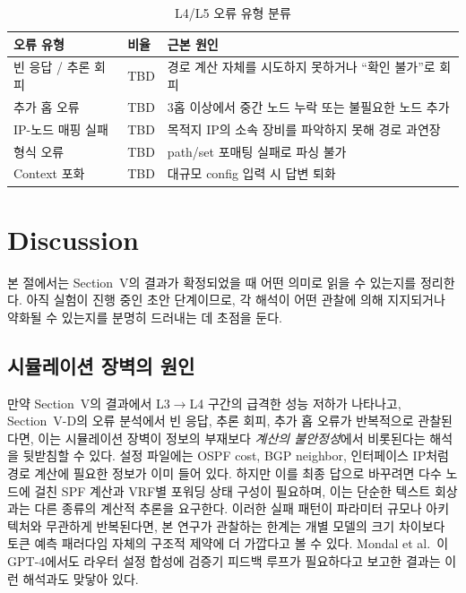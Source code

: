 \documentclass[journal]{IEEEtran}
\begin{document}
\begin{table}[!t]
  \caption{L4/L5 오류 유형 분류}
  \label{tab:error-analysis}
  \centering
  \small
  \begin{tabular}{|L{2.8cm}|C{2.0cm}|L{7.0cm}|}
    \hline
    \textbf{오류 유형} & \textbf{비율} & \textbf{근본 원인}                    \\
    \hline
    빈 응답 / 추론 회피   & TBD         & 경로 계산 자체를 시도하지 못하거나 ``확인 불가''로 회피 \\
    \hline
    추가 홉 오류        & TBD         & 3홉 이상에서 중간 노드 누락 또는 불필요한 노드 추가    \\
    \hline
    IP-노드 매핑 실패    & TBD         & 목적지 IP의 소속 장비를 파악하지 못해 경로 과연장     \\
    \hline
    형식 오류          & TBD         & path/set 포매팅 실패로 파싱 불가            \\
    \hline
    Context 포화     & TBD         & 대규모 config 입력 시 답변 퇴화             \\
    \hline
  \end{tabular}
\end{table}

\section{Discussion}
본 절에서는 Section~V의 결과가 확정되었을 때 어떤 의미로 읽을 수 있는지를 정리한다. 아직 실험이 진행 중인 초안 단계이므로, 각 해석이 어떤 관찰에 의해 지지되거나 약화될 수 있는지를 분명히 드러내는 데 초점을 둔다.
\subsection{시뮬레이션 장벽의 원인}
만약 Section~V의 결과에서 L3$\rightarrow$L4 구간의 급격한 성능 저하가 나타나고, Section~V-D의 오류 분석에서 빈 응답, 추론 회피, 추가 홉 오류가 반복적으로 관찰된다면, 이는 시뮬레이션 장벽이 정보의 부재보다 \emph{계산의 불안정성}에서 비롯된다는 해석을 뒷받침할 수 있다. 설정 파일에는 OSPF cost, BGP neighbor, 인터페이스 IP처럼 경로 계산에 필요한 정보가 이미 들어 있다. 하지만 이를 최종 답으로 바꾸려면 다수 노드에 걸친 SPF 계산과 VRF별 포워딩 상태 구성이 필요하며, 이는 단순한 텍스트 회상과는 다른 종류의 계산적 추론을 요구한다. 이러한 실패 패턴이 파라미터 규모나 아키텍처와 무관하게 반복된다면, 본 연구가 관찰하는 한계는 개별 모델의 크기 차이보다 토큰 예측 패러다임 자체의 구조적 제약에 더 가깝다고 볼 수 있다. Mondal et al.~\cite{ref30}이 GPT-4에서도 라우터 설정 합성에 검증기 피드백 루프가 필요하다고 보고한 결과는 이런 해석과도 맞닿아 있다.
\end{document}
